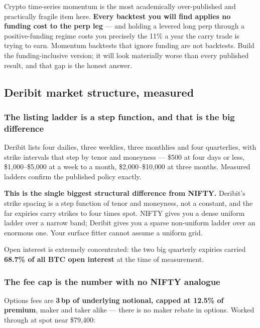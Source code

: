 \documentclass[11pt,a4paper]{article}
\begin{document}
\begin{waste}
Crypto time-series momentum is the most academically over-published and
practically fragile item here. \textbf{Every backtest you will find applies no
funding cost to the perp leg} --- and holding a levered long perp through a
positive-funding regime costs you precisely the 11\% a year the carry trade is
trying to earn. Momentum backtests that ignore funding are not backtests. Build
the funding-inclusive version; it will look materially worse than every published
result, and that gap is the honest answer.
\end{waste}

\subsection{Deribit market structure, measured}

\subsubsection{The listing ladder is a step function, and that is the big difference}

Deribit lists four dailies, three weeklies, three monthlies and four quarterlies,
with strike intervals that step by tenor and moneyness --- \$500 at four days or
less, \$1{,}000--\$5{,}000 at a week to a month, \$2{,}000--\$10{,}000 at three
months. Measured ladders confirm the published policy exactly.

\textbf{This is the single biggest structural difference from NIFTY.} Deribit's
strike spacing is a step function of tenor and moneyness, not a constant, and the
far expiries carry strikes to four times spot. NIFTY gives you a dense uniform
ladder over a narrow band; Deribit gives you a sparse non-uniform ladder over an
enormous one. Your surface fitter cannot assume a uniform grid.

Open interest is extremely concentrated: the two big quarterly expiries carried
\textbf{68.7\% of all BTC open interest} at the time of measurement.

\subsubsection{The fee cap is the number with no NIFTY analogue}

Options fees are \textbf{3\,bp of underlying notional, capped at 12.5\% of
premium}, maker and taker alike --- there is no maker rebate in options. Worked
through at spot near \$79{,}400:
\end{document}
